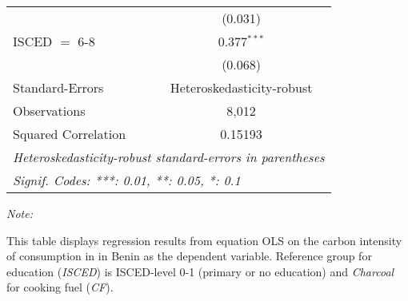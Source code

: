 \begin{table}[htbp!]
\begin{adjustbox}{width = 1\textwidth, max height = 0.95\textheight, center}
\begin{threeparttable}[b]
\begin{tabular}{lc}
                                & (0.031)\\   
            ISCED $=$ 6-8       & 0.377$^{***}$\\   
                                & (0.068)\\   
            \midrule 
            Standard-Errors     & Heteroskedasticity-robust \\   
            Observations        & 8,012\\  
            Squared Correlation & 0.15193\\  
            \midrule \midrule
            \multicolumn{2}{l}{\emph{Heteroskedasticity-robust standard-errors in parentheses}}\\
            \multicolumn{2}{l}{\emph{Signif. Codes: ***: 0.01, **: 0.05, *: 0.1}}\\
         \end{tabular}
         
         \begin{tablenotes}\item \medskip \textit{Note:}
            \item This table displays regression results from equation OLS on the carbon intensity of consumption in  in Benin as the dependent variable. Reference group for education (\textit{ISCED}) is ISCED-level 0-1 (primary or no education) and \textit{Charcoal} for cooking fuel (\textit{CF}).
         \end{tablenotes}
      \end{threeparttable}
   \end{adjustbox}
\end{table}


